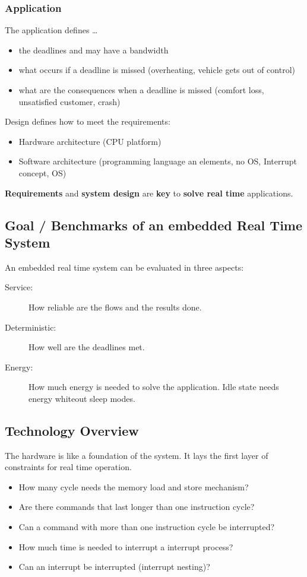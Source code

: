 \subsubsection{Application}
The application defines \ldots
\begin{itemize}[label=\ldots]
  \item the deadlines and may have a bandwidth
  \item what occurs if a deadline is missed (overheating, vehicle gets out of control)
  \item what are the consequences when a deadline is missed (comfort loss, unsatisfied customer, crash)

\end{itemize}
Design defines how to meet the requirements:
\begin{itemize}
  \item Hardware architecture (CPU platform)
  \item Software architecture (programming language an elements, no OS, Interrupt concept, OS)
\end{itemize}
\textbf{Requirements} and \textbf{system design} are \textbf{key} to \textbf{solve real time} applications.

\subsection{Goal / Benchmarks of an embedded Real Time System}
An embedded real time system can be evaluated in three aspects:
\begin{description}
  \item [Service:] How reliable are the flows and the results done.
  \item [Deterministic:] How well are the deadlines met.
  \item [Energy:] How much energy is needed to solve the application.
        Idle state needs energy whiteout sleep modes.
\end{description}


\subsection{Technology Overview}
The hardware is like a foundation of the system.
It lays the first layer of constraints for real time operation.
\begin{itemize}
  \item How many cycle needs the memory load and store mechanism?
  \item Are there commands that last longer than one instruction cycle?
  \item Can a command with more than one instruction cycle be interrupted?
  \item How much time is needed to interrupt a interrupt process?
  \item Can an interrupt be interrupted (interrupt nesting)?
\end{itemize}

